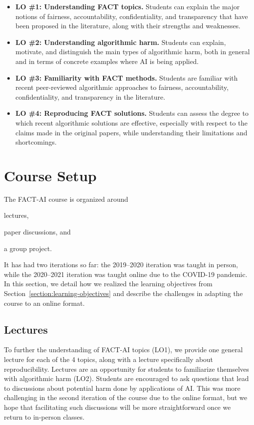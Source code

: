 \documentclass[letterpaper]{article}
\begin{document}
\begin{itemize}
\setlength\itemsep{1em}
	\item \textbf{LO \#1: Understanding FACT topics.} Students can explain the major notions of fairness, accountability, confidentiality, and transparency that have been proposed in the literature, along with their strengths and weaknesses.
	\item \textbf{LO \#2: Understanding algorithmic harm.} Students can explain, motivate, and distinguish the main types of algorithmic harm, both in general and in terms of concrete examples where AI is being applied.
	\item \textbf{LO \#3: Familiarity with FACT methods.} Students are familiar with recent peer-reviewed algorithmic approaches to fairness, accountability, confidentiality, and transparency in the literature. 
    \item \textbf{LO \#4: Reproducing FACT solutions.} Students can assess the degree to which recent algorithmic solutions are effective, especially with respect to the claims made in the original papers, while understanding their limitations and shortcomings. 
\end{itemize}


\section{Course Setup}
\label{section:coursesetup}
The FACT-AI course is organized around 
\begin{enumerate*}[label=(\roman*)]
    \item lectures, 
    \item paper discussions, and
    \item a group project. 
\end{enumerate*}
It has had two iterations so far: the 2019--2020 iteration was taught in person, while the 2020--2021 iteration was taught online due to the COVID-19 pandemic. 
In this section, we detail how we realized the learning objectives from Section~\ref{section:learning-objectives} and describe the challenges in adapting the course to an online format.

\subsection{Lectures}
To further the understanding of FACT-AI topics (LO1), we provide one general lecture for each of the 4 topics, along with a lecture specifically about reproducibility.
Lectures are an opportunity for students to familiarize themselves with algorithmic harm (LO2). Students are encouraged to ask questions that lead to discussions about potential harm done by applications of AI. 
This was more challenging in the second iteration of the course due to the online format, but we hope that facilitating such discussions will be more straightforward once we return to in-person classes. 
\end{document}

